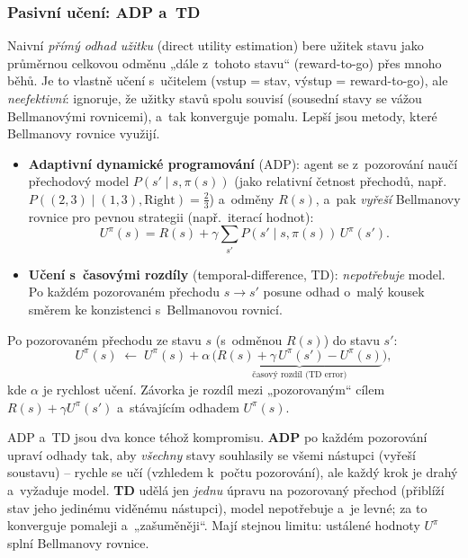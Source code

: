 \subsubsection*{Pasivní učení: ADP a~TD}

Naivní \emph{přímý odhad užitku} (direct utility estimation) bere užitek stavu jako průměrnou celkovou odměnu „dále z~tohoto stavu`` (reward-to-go) přes mnoho běhů. Je to vlastně učení s~učitelem (vstup = stav, výstup = reward-to-go), ale \emph{neefektivní}: ignoruje, že užitky stavů spolu souvisí (sousední stavy se vážou Bellmanovými rovnicemi), a~tak konverguje pomalu. Lepší jsou metody, které Bellmanovy rovnice využijí.

\begin{definice}
\begin{itemize}
  \item \textbf{Adaptivní dynamické programování} (ADP): agent se z~pozorování naučí přechodový model $P(s'\mid s,\pi(s))$ (jako relativní četnost přechodů, např.\ $P((2,3)\mid (1,3),\text{Right})=\tfrac23$) a~odměny $R(s)$, a~pak \emph{vyřeší} Bellmanovy rovnice pro pevnou strategii (např.\ iterací hodnot):
  \[ U^{\pi}(s) = R(s) + \gamma\sum_{s'}P(s'\mid s,\pi(s))\,U^{\pi}(s'). \]
  \item \textbf{Učení s~časovými rozdíly} (temporal-difference, TD): \emph{nepotřebuje} model. Po každém pozorovaném přechodu $s\to s'$ posune odhad o~malý kousek směrem ke konzistenci s~Bellmanovou rovnicí.
\end{itemize}
\end{definice}

\begin{algo}[Aktualizace TD]
Po pozorovaném přechodu ze stavu $s$ (s~odměnou $R(s)$) do stavu $s'$:
\[ U^{\pi}(s) \;\leftarrow\; U^{\pi}(s) + \alpha\,\big(\underbrace{R(s) + \gamma\,U^{\pi}(s') - U^{\pi}(s)}_{\text{časový rozdíl (TD error)}}\big), \]
kde $\alpha$ je rychlost učení. Závorka je rozdíl mezi „pozorovaným`` cílem $R(s)+\gamma U^{\pi}(s')$ a~stávajícím odhadem $U^{\pi}(s)$.
\end{algo}

\begin{intuice}
ADP a~TD jsou dva konce téhož kompromisu. \textbf{ADP} po každém pozorování upraví odhady tak, aby \emph{všechny} stavy souhlasily se všemi nástupci (vyřeší soustavu) -- rychle se učí (vzhledem k~počtu pozorování), ale každý krok je drahý a~vyžaduje model. \textbf{TD} udělá jen \emph{jednu} úpravu na pozorovaný přechod (přiblíží stav jeho jedinému viděnému nástupci), model nepotřebuje a~je levné; za to konverguje pomaleji a~„zašuměněji``. Mají stejnou limitu: ustálené hodnoty $U^{\pi}$ splní Bellmanovy rovnice.
\end{intuice}

